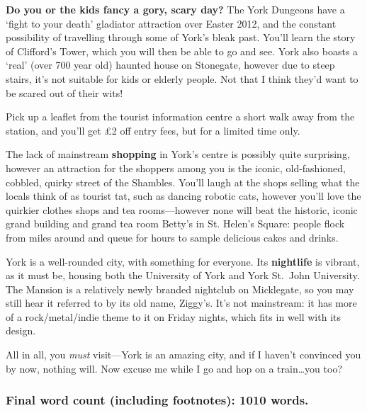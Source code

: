 \documentclass[11pt,a4paper]{article}
\begin{document}
\textbf{Do you or the kids fancy a gory, scary day?}  The York Dungeons
have a `fight to your death' gladiator attraction over Easter 2012, and the
constant possibility of travelling through some of York's bleak past.
You'll learn the story of Clifford's Tower, which you will then be able to
go and see.  York also boasts a `real' (over 700 year old) haunted house on
Stonegate, however due to steep stairs, it's not suitable for kids or
elderly people.  Not that I think they'd want to be scared out of their
wits!

Pick up a leaflet from the tourist information centre a short walk away from the station, and you'll get \pounds2 off entry fees, but for a limited time only.

The lack of mainstream \textbf{shopping} in York's centre is possibly quite surprising, however an attraction for the shoppers among you is the iconic, old-fashioned, cobbled, quirky street of the Shambles\footnotemark.  You'll laugh at the shops selling what the locals think of as tourist tat, such as dancing robotic cats, however you'll love the quirkier clothes shops and tea rooms---however none will beat the historic, iconic grand building and grand tea room Betty's in St. Helen's Square: people flock from miles around and queue for hours to sample delicious cakes and drinks.

York is a well-rounded city, with something for everyone.  Its \textbf{nightlife} is vibrant, as it must be, housing both the University of York and York St.\ John University.  The Mansion is a relatively newly branded nightclub on Micklegate, so you may still hear it referred to by its old name, Ziggy's.  It's not mainstream: it has more of a rock\slash metal\slash indie theme to it on Friday nights, which fits in well with its design.


All in all, you \textit{must} visit---York is an amazing city, and if I haven't convinced you by now, nothing will.  Now excuse me while I go and hop on a train\ldots you too?

\begin{center}
	\subsubsection*{Final word count (including footnotes): 1010 words.}
\end{center}
\end{document}
